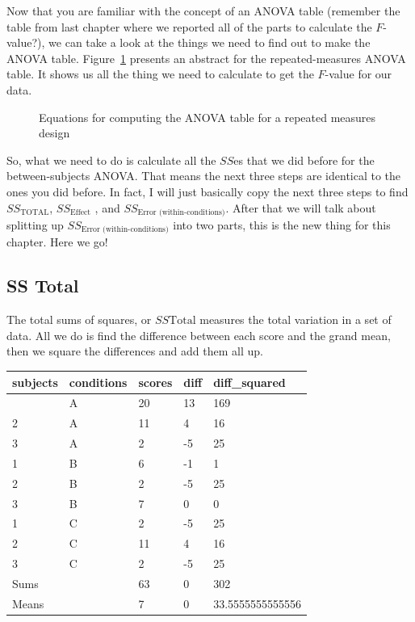 \documentclass[
  letterpaper,
  DIV=11,
  numbers=noendperiod]{scrreprt}
\begin{document}
Now that you are familiar with the concept of an ANOVA table (remember
the table from last chapter where we reported all of the parts to
calculate the \(F\)-value?), we can take a look at the things we need to
find out to make the ANOVA table. Figure~\ref{fig-9rmtable} presents an
abstract for the repeated-measures ANOVA table. It shows us all the
thing we need to calculate to get the \(F\)-value for our data.

\begin{figure}


\caption{\label{fig-9rmtable}Equations for computing the ANOVA table for
a repeated measures design}

\end{figure}%

So, what we need to do is calculate all the \(SS\)es that we did before
for the between-subjects ANOVA. That means the next three steps are
identical to the ones you did before. In fact, I will just basically
copy the next three steps to find \(SS_\text{TOTAL}\),
\(SS_\text{Effect}\) , and \(SS_\text{Error (within-conditions)}\).
After that we will talk about splitting up
\(SS_\text{Error (within-conditions)}\) into two parts, this is the new
thing for this chapter. Here we go!

\subsection{SS Total}\label{ss-total-1}

The total sums of squares, or \(SS\text{Total}\) measures the total
variation in a set of data. All we do is find the difference between
each score and the grand mean, then we square the differences and add
them all up.

\begin{longtable}[]{@{}lllll@{}}
\toprule\noalign{}
subjects & conditions & scores & diff & diff\_squared \\
\midrule\noalign{}
\endhead
\bottomrule\noalign{}
\endlastfoot
1 & A & 20 & 13 & 169 \\
2 & A & 11 & 4 & 16 \\
3 & A & 2 & -5 & 25 \\
1 & B & 6 & -1 & 1 \\
2 & B & 2 & -5 & 25 \\
3 & B & 7 & 0 & 0 \\
1 & C & 2 & -5 & 25 \\
2 & C & 11 & 4 & 16 \\
3 & C & 2 & -5 & 25 \\
Sums & & 63 & 0 & 302 \\
Means & & 7 & 0 & 33.5555555555556 \\
\end{longtable}
\end{document}
